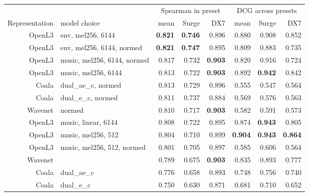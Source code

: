 
\begin{table}[ht]
  \centering
  \small
  \tabcolsep=0.11cm
  \begin{tabular}{rlrrrrrr}
{} & & \multicolumn{3}{c}{Spearman in preset} & \multicolumn{3}{c}{DCG across presets} \\
Representation & model choice &  mean & Surge & DX7 & mean & Surge & DX7  \\
\hline
OpenL3 \cite{Cramer:LearnMore:ICASSP:19} & env, mel256, 6144  & \textbf{0.821} & \textbf{0.746} & 0.896 & 0.880 & 0.908 &  0.852 \\
OpenL3 \cite{Cramer:LearnMore:ICASSP:19}& env, mel256, 6144, normed &         \textbf{0.821} & \textbf{0.747} & 0.895 & 0.809 & 0.883 & 0.735 \\
OpenL3 \cite{Cramer:LearnMore:ICASSP:19} & music, mel256, 6144, normed & 0.817 & 0.732 & \textbf{0.903} & 0.820 & 0.916 & 0.724 \\
OpenL3 \cite{Cramer:LearnMore:ICASSP:19} & music, mel256, 6144  & 0.813 & 0.722 & \textbf{0.903} & 0.892 & \textbf{0.942} & 0.842 \\
Coala \cite{drossos:icml:2020} & dual\_ae\_c, normed & 0.813 & 0.729 &
 0.896 & 0.555 & 0.547 & 0.564 \\
Coala \cite{drossos:icml:2020} & dual\_e\_c, normed &          0.811 & 0.737 & 0.884 & 0.569 & 0.576 & 0.563 \\
 Wavenet \cite{engel2017neural} & normed & 0.810 & 0.717 & \textbf{0.903} &  0.582 & 0.591 & 0.573 \\
OpenL3 \cite{Cramer:LearnMore:ICASSP:19} & music, linear, 6144 & 0.808 & 0.722 & 0.895 & 0.874 & \textbf{0.943} & 0.805 \\
OpenL3 \cite{Cramer:LearnMore:ICASSP:19} & music, mel256, 512 & 0.804 &           0.710 & 0.899 & \textbf{0.904} & \textbf{0.943} & \textbf{0.864} \\
OpenL3 \cite{Cramer:LearnMore:ICASSP:19} & music, mel256, 512, normed & 0.801 & 0.705 & 0.897 & 0.585 & 0.606 & 0.564 \\
Wavenet \cite{engel2017neural} & & 0.789 & 0.675 &  \textbf{0.903} &             0.835 &              0.893 &                 0.777 \\
Coala \cite{drossos:icml:2020} & dual\_ae\_c &         0.776 &           0.658 &              0.893 &             0.748 &              0.756 &                 0.740 \\
Coala \cite{drossos:icml:2020} & dual\_e\_c &         0.750 &           0.630 &
 0.871 &             0.681 &              0.710 &                 0.652 \\

\end{tabular}
\end{table}
